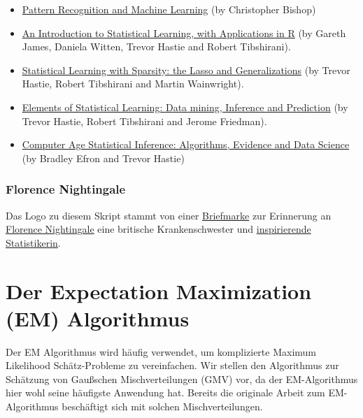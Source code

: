 \documentclass[
  ngerman,
]{book}
\begin{document}
\begin{itemize}
\item
  \href{https://www.microsoft.com/en-us/research/uploads/prod/2006/01/Bishop-Pattern-Recognition-and-Machine-Learning-2006.pdf}{Pattern Recognition and Machine Learning} (by Christopher Bishop)
\item
  \href{https://trevorhastie.github.io/ISLR/}{An Introduction to Statistical Learning, with Applications in R} (by Gareth James, Daniela Witten, Trevor Hastie and Robert Tibshirani).
\item
  \href{https://web.stanford.edu/~hastie/StatLearnSparsity/}{Statistical Learning with Sparsity: the Lasso and Generalizations} (by Trevor Hastie, Robert Tibshirani and Martin Wainwright).
\item
  \href{https://web.stanford.edu/~hastie/ElemStatLearn/}{Elements of Statistical Learning: Data mining, Inference and Prediction} (by Trevor Hastie, Robert Tibshirani and Jerome Friedman).
\item
  \href{https://web.stanford.edu/~hastie/CASI/}{Computer Age Statistical Inference: Algorithms, Evidence and Data Science} (by Bradley Efron and Trevor Hastie)
\end{itemize}

\hypertarget{florence-nightingale}{%
\subsection*{Florence Nightingale}\label{florence-nightingale}}

Das Logo zu diesem Skript stammt von einer \href{https://de.wikipedia.org/wiki/Datei:DBP_1955_225_Florence_Nightingale.jpg}{Briefmarke} zur Erinnerung an \href{https://de.wikipedia.org/wiki/Florence_Nightingale}{Florence Nightingale} eine britische Krankenschwester und \href{https://infowetrust.com/project/designhero}{inspirierende Statistikerin}.

\hypertarget{der-expectation-maximization-em-algorithmus}{%
\chapter{Der Expectation Maximization (EM) Algorithmus}\label{der-expectation-maximization-em-algorithmus}}

Der EM Algorithmus wird häufig verwendet, um komplizierte Maximum Likelihood Schätz-Probleme zu vereinfachen. Wir stellen den Algorithmus zur Schätzung von Gaußschen Mischverteilungen (GMV) vor, da der EM-Algorithmus hier wohl seine häufigste Anwendung hat. Bereits die originale Arbeit zum EM-Algorithmus \citep{Dempster_1977} beschäftigt sich mit solchen Mischverteilungen.
\end{document}
